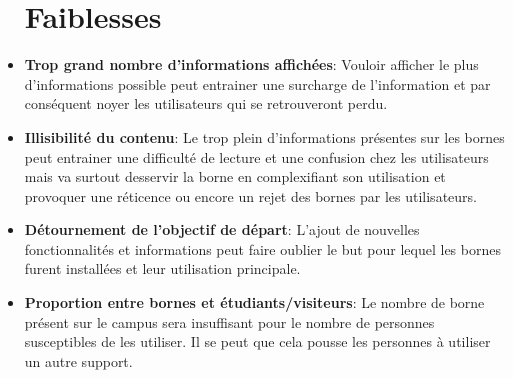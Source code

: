 \begin{itemize}
\section{Faiblesses}

\item\textbf{Trop grand nombre d’informations affichées}: Vouloir afficher le plus d’informations possible peut entrainer une surcharge de l’information et par conséquent noyer les utilisateurs qui se retrouveront perdu. 

\item\textbf{Illisibilité du contenu}: Le trop plein d’informations présentes sur les bornes peut entrainer une difficulté de lecture et une confusion chez les utilisateurs mais va surtout desservir la borne en complexifiant son utilisation et provoquer une réticence ou encore un rejet des bornes par les utilisateurs. 
\item\textbf{Détournement de l’objectif de départ}: L’ajout de nouvelles fonctionnalités et informations peut faire oublier le but pour lequel les bornes furent installées et leur utilisation principale. 

\item\textbf{Proportion entre bornes et étudiants/visiteurs}: Le nombre de borne présent sur le campus sera insuffisant pour le nombre de personnes susceptibles de les utiliser. Il se peut que cela pousse les personnes à utiliser un autre support. 

\end{itemize}


